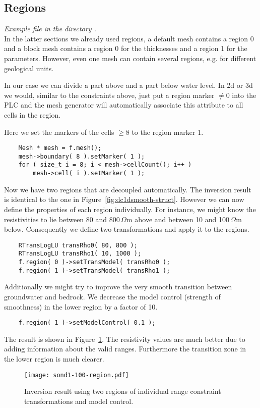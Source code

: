 \subsection{Regions}\label{sec:dc1dregion}
{\em Example file  in the directory .}\\
In the latter sections we already used regions, a default mesh contains a region 0 and a block mesh contains a region 0 for the thicknesses and a region 1 for the parameters.
However, even one mesh can contain several regions, e.g. for different geological units.

In our case we can divide a part above and a part below water level.
In 2d or 3d we would, similar to the constraints above, just put a region marker $\neq 0$ into the PLC and the mesh generator will automatically associate this attribute to all cells in the region.

Here we set the markers of the cells $\geq8$ to the region marker 1.
\begin{lstlisting}
    Mesh * mesh = f.mesh();
    mesh->boundary( 8 ).setMarker( 1 );
    for ( size_t i = 8; i < mesh->cellCount(); i++ ) 
        mesh->cell( i ).setMarker( 1 );
\end{lstlisting}

Now we have two regions that are decoupled automatically.
The inversion result is identical to the one in Figure~\ref{fig:dc1dsmooth-struct}.
However we can now define the properties of each region individually.
For instance, we might know the resistivities to lie between 80 and 800\,$\Omega$m above and between 10 and 100\,$\Omega$m below.
Consequently we define two transformations and apply it to the regions.
\begin{lstlisting}
    RTransLogLU transRho0( 80, 800 );
    RTransLogLU transRho1( 10, 1000 );
    f.region( 0 )->setTransModel( transRho0 );
    f.region( 1 )->setTransModel( transRho1 );
\end{lstlisting}

Additionally we might try to improve the very smooth transition between groundwater and bedrock.
We decrease the model control (strength of smoothness) in the lower region by a factor of 10.
\begin{lstlisting}
    f.region( 1 )->setModelControl( 0.1 );
\end{lstlisting}

The result is shown in Figure~\ref{fig:dc1dsmooth-region}.
The resistivity values are much better due to adding information about the valid ranges.
Furthermore the transition zone in the lower region is much clearer.
\begin{figure}[htbp]
\centering\texttt{[image: sond1-100-region.pdf]}
\caption{Inversion result using two regions of individual range constraint transformations and model control.}\label{fig:dc1dsmooth-region}
\end{figure}
